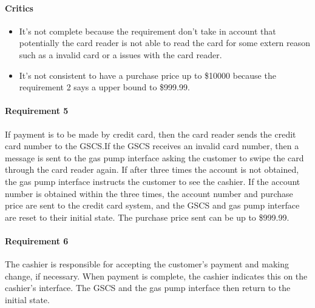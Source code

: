 \begin{framed}
    \paragraph{Critics} 
    \begin{itemize}
        \item It's not complete because the requirement don't take in
            account that potentially the card reader is not able to read
            the card for some extern reason such as a invalid card or a
            issues with the card reader.
        \item It's not consistent to have a purchase price up to \$10000
            because the requirement 2 says a upper bound to \$999.99.
    \end{itemize}

    \paragraph{Requirement 5} If payment is to be made by credit card, then the
    card reader sends the credit card number to the GSCS.\@ If the GSCS receives
    an invalid card number, then a message is sent to the gas pump interface
    asking the customer to swipe the card through the card reader again.
    If after three times the account is not obtained, the gas pump
    interface instructs the customer to see the cashier.
    If the account number is obtained within the three times, the
    account number and purchase price are
    sent to the credit card system, and the GSCS and gas pump interface are
    reset to their initial state. The purchase price sent can be up
    to \${}999.99.
\end{framed}

\paragraph{Requirement 6} The cashier is responsible for accepting the
customer's payment and making change, if necessary. When payment is
complete, the cashier indicates this on the cashier's interface. The GSCS
and the gas pump interface then return to the initial state.

